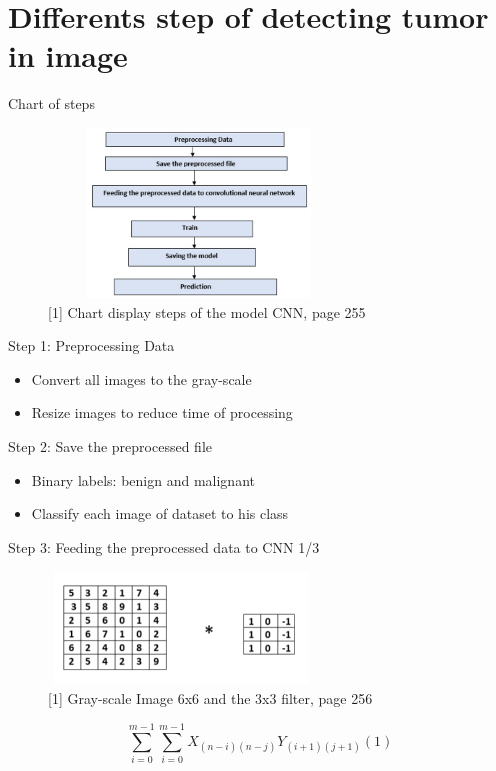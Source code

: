 \documentclass{beamer}
\begin{document}
\section{Differents step of detecting tumor in image} 
\begin{frame}{Chart of steps}
\begin{figure}[H]
    \includegraphics[width=8cm,height=4.5cm]{images/steps.png}
    \caption{[1] Chart display steps of the model CNN, page 255}
    \label{fig:L1}
\end{figure}
\end{frame} 
\begin{frame}{Step 1: Preprocessing Data}
\begin{itemize}
		\item Convert all images to the gray-scale
		\item Resize images to reduce time of processing
\end{itemize}
\end{frame} 

\begin{frame}{Step 2: Save the preprocessed file}
\begin{itemize}
		\item  Binary labels: benign and malignant
		\item Classify each image of dataset to his class
\end{itemize}
\end{frame} 

\begin{frame}{Step 3: Feeding the preprocessed data to CNN 1/3}
\begin{figure}[H]
    \includegraphics[width=7cm,height=3cm]{images/convolution.png}
    \caption{[1] Gray-scale Image 6x6 and the 3x3 filter, page 256}
    \label{fig:L1}
\end{figure}
$$ \sum_{i=0}^{m-1}\sum_{i=0}^{m-1} X_{(n-i)(n-j)}Y_{(i+1)(j+1)}    (1)$$
\end{frame} 
\end{document}
